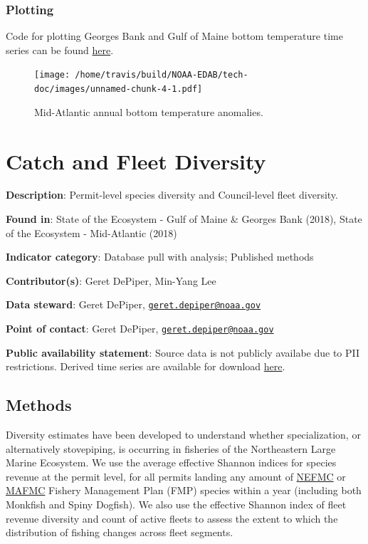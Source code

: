 \documentclass[
]{book}
\begin{document}
\hypertarget{plotting-2}{%
\subsection{Plotting}\label{plotting-2}}

Code for plotting Georges Bank and Gulf of Maine bottom temperature time series can be found \href{https://github.com/NOAA-EDAB/ecodata/blob/master/chunk-scripts/LTL.Rmd-MAB-bot-temp.R}{here}.

\begin{figure}
\centering
\texttt{[image: /home/travis/build/NOAA-EDAB/tech-doc/images/unnamed-chunk-4-1.pdf]}
\caption{\label{fig:unnamed-chunk-4}Mid-Atlantic annual bottom temperature anomalies.}
\end{figure}

\hypertarget{catch-and-fleet-diversity}{%
\chapter{Catch and Fleet Diversity}\label{catch-and-fleet-diversity}}

\textbf{Description}: Permit-level species diversity and Council-level fleet diversity.

\textbf{Found in}: State of the Ecosystem - Gulf of Maine \& Georges Bank (2018), State of the Ecosystem - Mid-Atlantic (2018)

\textbf{Indicator category}: Database pull with analysis; Published methods

\textbf{Contributor(s)}: Geret DePiper, Min-Yang Lee

\textbf{Data steward}: Geret DePiper, \href{mailto:geret.depiper@noaa.gov}{\nolinkurl{geret.depiper@noaa.gov}}

\textbf{Point of contact}: Geret DePiper, \href{mailto:geret.depiper@noaa.gov}{\nolinkurl{geret.depiper@noaa.gov}}

\textbf{Public availability statement}: Source data is not publicly availabe due to PII restrictions. Derived time series are available for download \href{https://comet.nefsc.noaa.gov/erddap/tabledap/comm_data_soe_v1.html}{here}.

\hypertarget{methods-5}{%
\section{Methods}\label{methods-5}}

Diversity estimates have been developed to understand whether specialization, or alternatively stovepiping, is occurring in fisheries of the Northeastern Large Marine Ecosystem. We use the average effective Shannon indices for species revenue at the permit level, for all permits landing any amount of \href{https://www.nefmc.org/}{NEFMC} or \href{http://www.mafmc.org/}{MAFMC} Fishery Management Plan (FMP) species within a year (including both Monkfish and Spiny Dogfish). We also use the effective Shannon index of fleet revenue diversity and count of active fleets to assess the extent to which the distribution of fishing changes across fleet segments.
\end{document}
